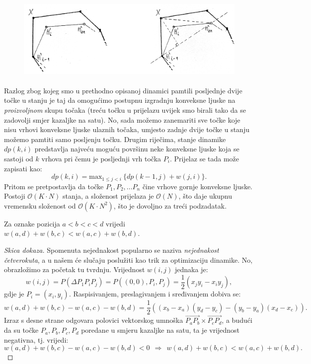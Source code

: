 \begin{figure}[h]
  \centering
  \includegraphics[height=4cm]{pic/img2.png}
\end{figure}

Razlog zbog kojeg smo u prethodno opisanoj dinamici pamtili posljednje dvije
točke u stanju je taj da omogućimo postupnu izgradnju konveksne ljuske na \textit{proizvoljnom}
skupu točaka (treću točku u prijelazu uvijek smo birali tako da se zadovolji smjer kazaljke
na satu). No, sada možemo zanemariti sve točke koje nisu vrhovi konveksne
ljuske ulaznih točaka, umjesto zadnje dvije točke u stanju možemo pamtiti
samo posljenju točku. Drugim riječima, stanje dinamike $dp(k,i)$ predstavlja
najveću moguću površinu neke konveksne ljuske koja se sastoji od $k$ vrhova
pri čemu je posljednji vrh točka $P_i$. Prijelaz se tada može zapisati kao:
\begin{equation*}
  dp(k,i) = \text{max}_{1 \le j < i}\ \{ dp(k-1, j) + w(j, i) \}.
\end{equation*}
Pritom se pretpostavlja da točke $P_1, P_2, ... P_n$ čine vrhove gornje
konveksne ljuske.
Postoji $\mathcal{O}(K \cdot N)$ stanja, a složenost prijelaza je $\mathcal{O}(N)$, što
daje ukupnu vremensku složenost od $\mathcal{O}(K \cdot N^2)$, što je dovoljno za
treći podzadatak.

\begin{zamjedba}
  \label{quadrangle}
  Za oznake pozicija $a < b < c < d$ vrijedi $w(a,d) + w(b,c) < w(a,c) + w(b,d)$.
\end{zamjedba}

\begin{proof}[Skica dokaza]
  Spomenuta nejednakost popularno se naziva \textit{nejednakost četverokuta}, a u našem će
  slučaju poslužiti kao trik za optimizaciju dinamike. No, obrazložimo
  za početak tu tvrdnju. Vrijednost $w(i,j)$ jednaka je:
  \begin{equation*}
    w(i,j) = P(\Delta P_1P_iP_j) = P((0, 0), P_i, P_j) = \frac{1}{2}(x_j y_i - x_i y_j),
  \end{equation*}
  gdje je $P_i = (x_i, y_i)$. Raspisivanjem, preslagivanjem i sređivanjem
  dobiva se:
  \begin{equation*}
    w(a,d) + w(b,c) - w(a,c) - w(b,d) = \frac{1}{2}((x_b - x_a)(y_d - y_c) - (y_b - y_a)(x_d - x_c)).
  \end{equation*}
  Izraz s desne strane odgovara polovici vektorskog umnoška $\overrightarrow{P_a P_b} \times
  \overrightarrow{P_c P_d}$, a budući da su točke $P_a, P_b, P_c, P_d$ poredane u
  smjeru kazaljke na satu, ta je vrijednost negativna, tj. vrijedi:
  \begin{equation*}
    w(a,d) + w(b,c) - w(a,c) - w(b,d) < 0\ \ \Rightarrow\ \
    w(a,d) + w(b,c) < w(a,c) + w(b,d).
  \end{equation*}
\end{proof}

